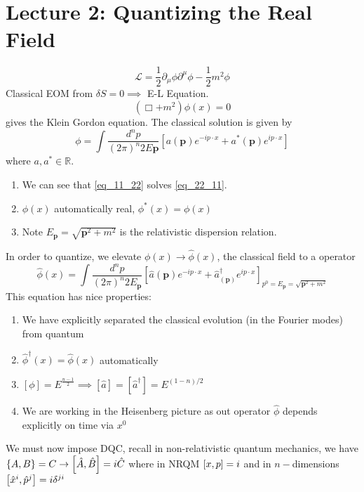 
\section{Lecture 2: Quantizing the Real Field}

\begin{equation}
    \mathcal{L} = \frac{1}{2}\partial_{\mu} \phi \partial^\mu \phi - \frac{1}{2} m^2 \phi
\end{equation}
Classical EOM from $\delta S = 0 \implies $ E-L Equation.
\begin{equation}\label{eq_11_22}
    (\Box +m^2)\phi(x) = 0
\end{equation}
gives the Klein Gordon equation. The classical solution is given by
\begin{equation}\label{eq_22_11}
    \phi = \int \frac{d^n p}{(2\pi)^n 2E\bm{p}} \left[ a(\bm{p}) e^{-ip\cdot x} +  a^*(\bm{p}) e^{ip\cdot x} \right]
\end{equation}
where $a, a^* \in \mathbb{R}$.  
\begin{enumerate}
\item We can see that \eqref{eq_11_22} solves \eqref{eq_22_11}. 
\item $\phi(x)$ automatically real, $\phi^*(x) = \phi(x)$
\item Note $E_{\bm{p}} = \sqrt{\bm{p}^2 + m^2}$ is the relativistic dispersion relation.
\end{enumerate}
In order to quantize, we elevate $\phi(x) \to \hat{\phi}(x)$, the classical field to a operator
\begin{equation}
    \hat{\phi}(x) = \int \frac{d^n p}{(2\pi)^n 2E_{\bm{p}}} \left[ \hat{a}(\bm{p}) e^{-ip\cdot x} +  \hat{a}^{\dagger}_(\bm{p}) e^{ip\cdot x} \right]_{p^0 = E_{\bm{p}} = \sqrt{\bm{p}^2 + m^2}}
\end{equation}
This equation has nice properties:
\begin{enumerate}
    \item We have explicitly separated the classical evolution (in the Fourier modes) from quantum
    \item $\hat{\phi}^{\dagger}(x) = \hat{\phi}(x)$ automatically
    \item $[\phi] = E^{\frac{n-1}{2}}\implies [\hat{a}] = [\hat{a}^{\dagger}] = E^{(1-n)/2}$
    \item We are working in the Heisenberg picture as out operator $\hat{\phi}$ depends explicitly on time via $x^{0}$
\end{enumerate}
We must now impose DQC, recall in non-relativistic quantum mechanics, we have $\{ A, B \} =C \to \comm{\hat{A}}{\hat{B}} = i\hat{C}$ where in NRQM $\comm{x}{p} = i$ and in $n-$dimensions $\comm{\hat{x}^i}{\hat{p}^j}  = i\delta^{ji}$
